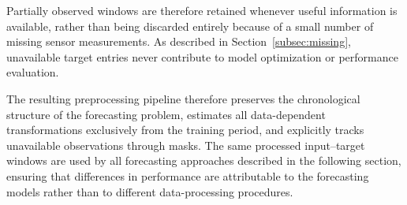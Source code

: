 Partially observed windows are therefore retained whenever useful information
is available, rather than being discarded entirely because of a small number
of missing sensor measurements. As described in
Section~\ref{subsec:missing}, unavailable target entries never contribute to
model optimization or performance evaluation.


The resulting preprocessing pipeline therefore preserves the chronological
structure of the forecasting problem, estimates all data-dependent
transformations exclusively from the training period, and explicitly tracks
unavailable observations through masks. The same processed input--target
windows are used by all forecasting approaches described in the following
section, ensuring that differences in performance are attributable to the
forecasting models rather than to different data-processing procedures.